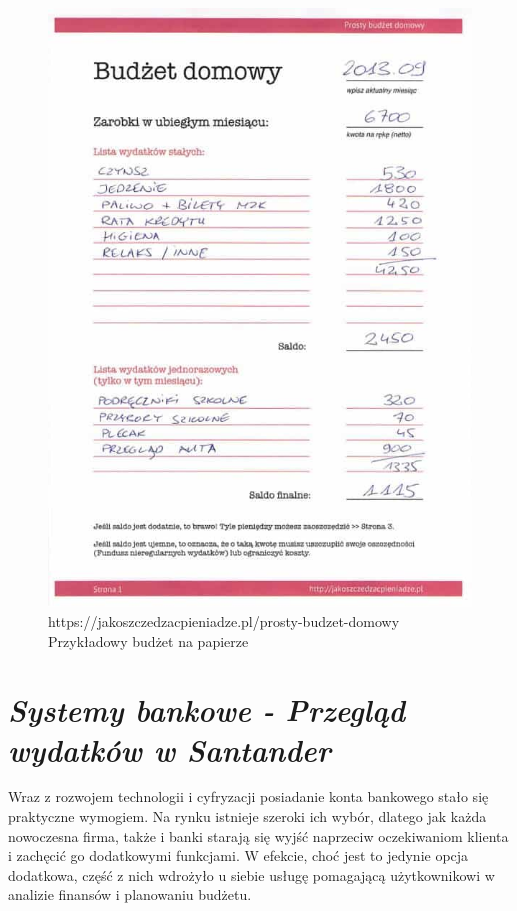 \documentclass[a4paper,10pt, twoside]{report}
\newcommand{\customstylesection}[1]{\textbf{\textit{#1}}}
\begin{document}
\begin{large}
\begin{figure}[H]           %
    \centering
    \includegraphics[width=12cm]{figures/jakoszczedzacpieniadze.pl_budzet-domowy-1.jpg}
    \caption{https://jakoszczedzacpieniadze.pl/prosty-budzet-domowy Przykładowy budżet na papierze}
    \label{fig:budzetprzykladowypapier}
\end{figure}

\section{\customstylesection{Systemy bankowe - Przegląd wydatków w Santander}}
{Wraz z rozwojem technologii i cyfryzacji posiadanie konta bankowego stało się 
praktyczne wymogiem. Na rynku istnieje szeroki ich wybór, dlatego jak każda 
nowoczesna firma, także i banki starają się wyjść naprzeciw oczekiwaniom 
klienta i zachęcić go dodatkowymi funkcjami. W efekcie, choć jest to jedynie 
opcja dodatkowa, część z nich wdrożyło u siebie usługę pomagającą użytkownikowi 
w analizie finansów i planowaniu budżetu.}


\end{large}
\end{document}
